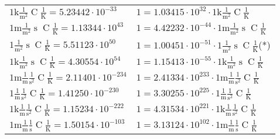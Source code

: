 \begin{center}
\begin{longtable}{l l}
{\color{gray}$1 \bm{\mathrm{ k}}\frac1{\operatorname{m}^2}{}{\operatorname{C}}\frac1{\operatorname{K}} = 5.23442\cdot10^{-33} $}   & {\color{gray}$ 1 = 1.03415\cdot10^{32} \cdot 1 \bm{\mathrm{ k}}\frac1{\operatorname{m}^2}{}{\operatorname{C}}\frac1{\operatorname{K}}$}  \\
{\color{gray}$1 \bm{\mathrm{ m}}\frac1{\operatorname{m}^2}{\operatorname{s}}{\operatorname{C}}\frac1{\operatorname{K}} = 1.13344\cdot10^{43} $}   & {\color{gray}$ 1 = 4.42232\cdot10^{-44} \cdot 1 \bm{\mathrm{ m}}\frac1{\operatorname{m}^2}{\operatorname{s}}{\operatorname{C}}\frac1{\operatorname{K}}$}  \\
{\color{black}$1 \bm{\mathrm{ }}\frac1{\operatorname{m}^2}{\operatorname{s}}{\operatorname{C}}\frac1{\operatorname{K}} = 5.51123\cdot10^{50} $}   & {\color{black}$ 1 = 1.00451\cdot10^{-51} \cdot 1 \bm{\mathrm{ }}\frac1{\operatorname{m}^2}{\operatorname{s}}{\operatorname{C}}\frac1{\operatorname{K}}$}\quad(*)\\
{\color{gray}$1 \bm{\mathrm{ k}}\frac1{\operatorname{m}^2}{\operatorname{s}}{\operatorname{C}}\frac1{\operatorname{K}} = 4.30554\cdot10^{54} $}   & {\color{gray}$ 1 = 1.15413\cdot10^{-55} \cdot 1 \bm{\mathrm{ k}}\frac1{\operatorname{m}^2}{\operatorname{s}}{\operatorname{C}}\frac1{\operatorname{K}}$}  \\
{\color{gray}$1 \bm{\mathrm{ m}}\frac1{\operatorname{m}}\frac1{\operatorname{s}^2}{\operatorname{C}}\frac1{\operatorname{K}} = 2.11401\cdot10^{-234} $}   & {\color{gray}$ 1 = 2.41334\cdot10^{233} \cdot 1 \bm{\mathrm{ m}}\frac1{\operatorname{m}}\frac1{\operatorname{s}^2}{\operatorname{C}}\frac1{\operatorname{K}}$}  \\
{\color{black}$1 \bm{\mathrm{ }}\frac1{\operatorname{m}}\frac1{\operatorname{s}^2}{\operatorname{C}}\frac1{\operatorname{K}} = 1.41250\cdot10^{-230} $}   & {\color{black}$ 1 = 3.30255\cdot10^{225} \cdot 1 \bm{\mathrm{ }}\frac1{\operatorname{m}}\frac1{\operatorname{s}^2}{\operatorname{C}}\frac1{\operatorname{K}}$}  \\
{\color{gray}$1 \bm{\mathrm{ k}}\frac1{\operatorname{m}}\frac1{\operatorname{s}^2}{\operatorname{C}}\frac1{\operatorname{K}} = 1.15234\cdot10^{-222} $}   & {\color{gray}$ 1 = 4.31534\cdot10^{221} \cdot 1 \bm{\mathrm{ k}}\frac1{\operatorname{m}}\frac1{\operatorname{s}^2}{\operatorname{C}}\frac1{\operatorname{K}}$}  \\
{\color{gray}$1 \bm{\mathrm{ m}}\frac1{\operatorname{m}}\frac1{\operatorname{s}}{\operatorname{C}}\frac1{\operatorname{K}} = 1.50154\cdot10^{-103} $}   & {\color{gray}$ 1 = 3.13124\cdot10^{102} \cdot 1 \bm{\mathrm{ m}}\frac1{\operatorname{m}}\frac1{\operatorname{s}}{\operatorname{C}}\frac1{\operatorname{K}}$}  \\

\end{longtable}
\end{center}
